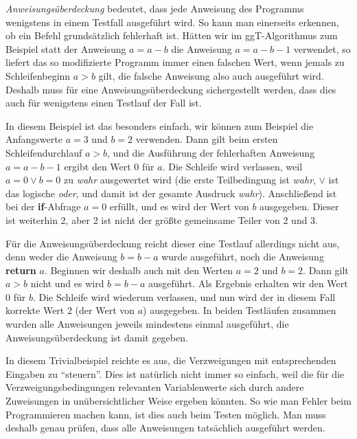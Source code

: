 
\vspace{2mm} %

\textit{Anweisungsüberdeckung} 
bedeutet, dass jede Anweisung des Programms wenigstens in einem Testfall ausgeführt wird. So kann man einerseits erkennen, ob ein Befehl grundsätzlich fehlerhaft ist. Hätten wir im ggT-Algorithmus zum Beispiel statt der Anweisung $a=a-b$ die Anweisung $a=a-b-1$ verwendet, so liefert das so modifizierte Programm immer einen falschen Wert, wenn jemals zu Schleifenbeginn $a>b$ gilt, die falsche Anweisung also auch ausgeführt wird. Deshalb muss für eine Anweisungsüberdeckung sichergestellt werden, dass dies auch für wenigstens einen Testlauf der Fall ist.

\pagebreak %

In diesem Beispiel ist das besonders einfach, wir können zum Beispiel die Anfangswerte $a=3$ und $b=2$ verwenden. Dann gilt beim ersten Schleifendurchlauf $a>b$, und die Ausführung der fehlerhaften Anweisung $a=a-b-1$ ergibt den Wert 0 für $a$. Die Schleife wird verlassen, weil $a=0 \vee b= 0$ zu \emph{wahr} ausgewertet wird (die erste Teilbedingung ist \emph{wahr}, $\vee$ ist das logische \emph{oder}, und damit ist der gesamte Ausdruck \emph{wahr}). Anschließend ist bei der \textbf{if}-Abfrage $a=0$ erfüllt, und es wird der Wert von $b$ ausgegeben. Dieser ist weiterhin 2, aber 2 ist nicht der größte gemeinsame Teiler von 2 und 3.

\vspace{2.75mm} %

Für die Anweisungsüberdeckung reicht dieser eine Testlauf allerdings nicht aus, denn weder die Anweisung $b=b-a$ wurde ausgeführt, noch die Anweisung \textbf{return} $a$. Beginnen wir deshalb auch mit den Werten $a=2$ und $b=2$. Dann gilt $a>b$ nicht und es wird $b=b-a$ ausgeführt. Als Ergebnis erhalten wir den Wert 0 für $b$. Die Schleife wird wiederum verlassen, und nun wird der in diesem Fall korrekte Wert 2 (der Wert von $a$) ausgegeben. In beiden Testläufen zusammen wurden alle Anweisungen jeweils mindestens einmal ausgeführt, die Anweisungsüberdeckung ist damit gegeben.

\vspace{2.75mm} %

In diesem Trivialbeispiel reichte es aus, die Verzweigungen mit entsprechenden Eingaben zu "`steuern"'. Dies ist natürlich nicht immer so einfach, weil die für die Verzweigungsbedingungen relevanten Variablenwerte sich durch andere Zuweisungen in unübersichtlicher Weise ergeben könnten. So wie man Fehler beim Programmieren machen kann, ist dies auch beim Testen möglich. Man muss deshalb genau prüfen, dass alle Anweisungen tatsächlich ausgeführt werden.


